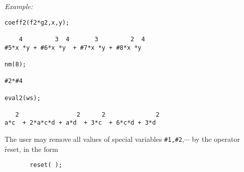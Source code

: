 \textit{Example:}
\begin{verbatim}
coeff2(f2*g2,x,y);

    4         3  4       3         2  4
#5*x *y + #6*x *y  + #7*x *y + #8*x *y

nm(8);

#2*#4

eval2(ws);

   2                2      2              2
a*c  + 2*a*c*d + a*d  + 3*c  + 6*c*d + 3*d

\end{verbatim}
The user may remove all values of special variables \verb|#1,#2|,$\cdots$
by the operator \hypertarget{operator:RESET}{}\f{reset}, in the form
\begin{verbatim}
       reset( );
\end{verbatim}

